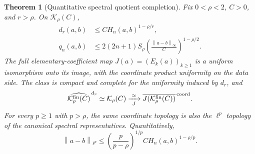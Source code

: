 \documentclass[11pt,a4paper]{amsart}
\numberwithin{equation}{section}
\newtheorem{theorem}{Theorem}[section]
\theoremstyle{definition}
\theoremstyle{remark}
\newcommand{\norm}[1]{\left\lVert#1\right\rVert}
\begin{document}
\begin{theorem}[Quantitative spectral quotient completion]\label{thm:pfaffian_subcritical}
Fix $0<\rho<2$, $C>0$, and $r>\rho$. On $\mathcal K_\rho(C)$,
\begin{align}
 d_r(a,b)&\le C H_n(a,b)^{1-\rho/r},\label{eq:pfaffian_subcritical_inverse}\\
 q_n(a,b)&\le2(2n+1)S_\rho
       \left(\frac{\norm{a-b}_\infty}{C}\right)^{1-\rho/2}.
 \label{eq:pfaffian_forward_inverse}
\end{align}
The full elementary-coefficient map $J(a)=(E_k(a))_{k\ge1}$ is a uniform isomorphism onto its image, with the coordinate product uniformity on the data side. The class is compact and complete for the uniformity induced by $d_r$, and
\begin{equation}\label{eq:pfaffian_completed_iso}
 \widehat{\mathcal K_\rho^{\rm fin}(C)}^{\,d_r}
 \simeq\mathcal K_\rho(C)
 \xrightarrow[\ J\ ]{\simeq}
 \overline{J(\mathcal K_\rho^{\rm fin}(C))}^{\,\rm coord}.
\end{equation}
For every $p\ge1$ with $p>\rho$, the same coordinate topology is also the $\ell^p$ topology of the canonical spectral representatives. Quantitatively,
\begin{equation}\label{eq:pfaffian_strong_subcritical}
 \norm{a-b}_{\ell^p}
 \le\left(\frac{p}{p-\rho}\right)^{1/p}
       C H_n(a,b)^{1-\rho/p}.
\end{equation}
\end{theorem}
\end{document}
